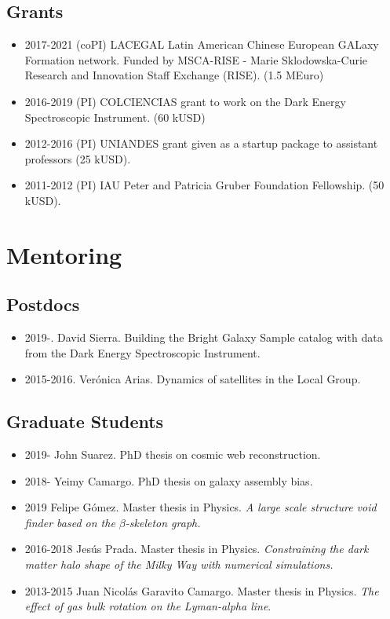 \documentclass[a4paper,10pt]{article} %
\begin{document}
\subsection{Grants}
\begin{itemize}
\item 2017-2021 (coPI) LACEGAL Latin American Chinese European GALaxy Formation network.
Funded by MSCA-RISE - Marie Sklodowska-Curie Research and Innovation Staff Exchange (RISE). (1.5 MEuro)
\item 2016-2019 (PI) COLCIENCIAS grant to work on the Dark
  Energy Spectroscopic Instrument. (60 kUSD)
\item 2012-2016 (PI) UNIANDES grant given as a startup package to
assistant professors (25 kUSD).
\item 2011-2012 (PI) IAU Peter and Patricia Gruber Foundation
  Fellowship. (50 kUSD).
\end{itemize}

\color{red}
\section{Mentoring}
\color{black}

\subsection{Postdocs}

\begin{itemize}
\item 2019-. David Sierra. Building the Bright Galaxy Sample catalog 
with data from the Dark Energy Spectroscopic Instrument.
\item 2015-2016. Ver\'onica Arias. Dynamics of satellites in the
  Local Group.  
\end{itemize}

\subsection{Graduate Students}

\begin{itemize}

\item 2019- John Suarez. PhD thesis on cosmic web reconstruction.
\item 2018- Yeimy Camargo. PhD thesis on galaxy assembly bias.
\item 2019 Felipe G\'omez. Master thesis in Physics.
\emph{A large scale structure void finder based on the $\beta$-skeleton graph.}
\item 2016-2018 Jes\'us Prada.
  Master thesis in Physics.
\emph{Constraining the dark matter halo shape of the Milky Way with
  numerical simulations.} 
\item 2013-2015 Juan Nicol\'as Garavito Camargo. Master
  thesis in Physics. \emph{The effect of
    gas bulk rotation on the Lyman-alpha line}.
\end{itemize}
\end{document}
